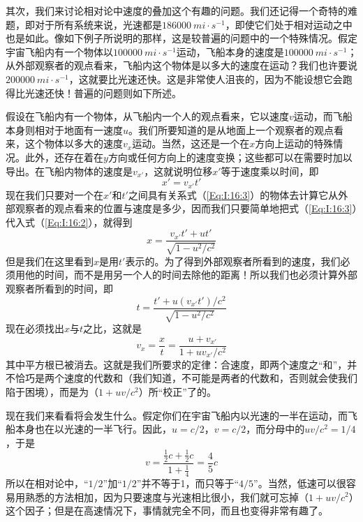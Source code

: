 其次，我们来讨论相对论中速度的叠加这个有趣的问题。我们还记得一个奇特的难题，即对于所有系统来说，光速都是$186000~mi \cdot s^{-1}$，即使它们处于相对运动之中也是如此。像如下例子所说明的那样，这是较普遍的问题中的一个特殊情况。假定宇宙飞船内有一个物体以$100000~mi \cdot s^{-1}$运动，飞船本身的速度是$100000~mi \cdot s^{-1}$；从外部观察者的观点看来，飞船内这个物体是以多大的速度在运动？我们也许要说$200000~mi \cdot s^{-1}$，这就要比光速还快。这是非常使人沮丧的，因为不能设想它会跑得比光速还快！普遍的问题则如下所述。

假设在飞船内有一个物体，从飞船内一个人的观点看来，它以速度$v$运动，而飞船本身则相对于地面有一速度$u$。我们所要知道的是从地面上一个观察者的观点看来，这个物体以多大的速度$v_x$运动。当然，这还是一个在$x$方向上运动的特殊情况。此外，还存在着在$y$方向或任何方向上的速度变换；这些都可以在需要时加以导出。在飞船内物体的速度是$v_{x'}$，这就说明位移$x'$等于速度乘以时间，即
\begin{equation}
    \label{Eq:I:16:3}
    x'=v_{x'}t'
\end{equation}
现在我们只要对一个在$x'$和$t'$之间具有关系式（\ref{Eq:I:16:3}）的物体去计算它从外部观察者的观点看来的位置与速度是多少，因而我们只要简单地把式（\ref{Eq:I:16:3}）代入式（\ref{Eq:I:16:2}），就得到
\begin{equation}
    \label{Eq:I:16:4}
    x=\frac{v_{x'}t'+ut'}{\sqrt{1-u^2/c^2}}
\end{equation}
但是我们在这里看到$x$是用$t'$表示的。为了得到外部观察者所看到的速度，我们必须用他的时间，而不是用另一个人的时间去除他的距离！所以我们也必须计算外部观察者所看到的时间，即
\begin{equation}
    \label{Eq:I:16:5}
    t=\frac{t'+u(v_{x'}t')/c^2}{\sqrt{1-u^2/c^2}}
\end{equation}
现在必须找出$x$与$t$之比，这就是
\begin{equation}
    \label{Eq:I:16:6}
    v_x=\frac{x}{t}=\frac{u+v_{x'}}{1+uv_{x'}/c^2}
\end{equation}
其中平方根已被消去。这就是我们所要求的定律：合速度，即两个速度之“和”，并不恰巧是两个速度的代数和（我们知道，不可能是两者的代数和，否则就会使我们陷于困境），而是为（$1+uv/c^2$）所“校正”了的。

现在我们来看看将会发生什么。假定你们在宇宙飞船内以光速的一半在运动，而飞船本身也在以光速的一半飞行。因此，$u=c/2$，$v=c/2$，而分母中的$uv/c^2=1/4$，于是
\begin{equation*}
    v=\frac{\frac{1}{2}c+\frac{1}{2}c}{1+\frac{1}{4}}=\frac{4}{5}c
\end{equation*}
所以在相对论中，“$1/2$”加“$1/2$”并不等于1，而只等于“$4/5$”。当然，低速可以很容易用熟悉的方法相加，因为只要速度与光速相比很小，我们就可忘掉（$1+uv/c^2$）这个因子；但是在高速情况下，事情就完全不同，而且也变得非常有趣了。

